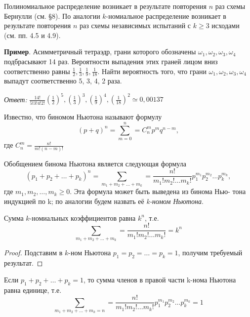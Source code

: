 
Полиномиальное распределение возникает в результате повторения $n$ раз
схемы Бернулли (см. §8). По аналогии $k$-номиальное распределение возникает в результате повторения $n$ раз схемы независимых испытаний с $k \geqslant 3$
исходами (см. пп. 4.5 и 4.9).

\textbf{Пример}. Асимметричный тетраэдр, грани которого обозначены $\omega_1, \omega_2,
\omega_3, \omega_4$ подбрасывают 14 раз. Вероятности выпадения этих граней лицом вниз
соответственно равны $\frac{1}{2},\frac{1}{3},\frac{1}{9},\frac{1}{18}$. Найти вероятность того, что грани $\omega_1, \omega_2, \omega_3, \omega_4$ выпадут соответственно 5, 3, 4, 2 раза.

\textit{Ответ: }$\frac{14!}{5!3!4!2!}(\frac{1}{2})^5,(\frac{1}{3})^3,(\frac{1}{9})^4,(\frac{1}{18})^2\simeq0,00137$

\begin{remark}
	Известно, что биномом Ньютона называют формулу
	\begin{equation*}
		(p+q)^n	=\sum\limits^n_{m=0}=C_n^mp^mq^{n-m},
	\end{equation*}
	где $C_n^m=\frac{n!}{m!(n-m)!}$


Обобщением бинома Ньютона является следующая формула
\begin{equation*}
	(p_1+p_2+\dots+ p_k)^n=\sum\limits_{m_1+m_2+\dots+m_k}=\frac{n!}{m_1!m_2!\dots m_k!}p_1^{m_1}p_2^{m_2}\dots p_k^{m_k},
\end{equation*}
где $m_1, m_2,\dots, m_k \geqslant 0$. Эта формула может быть выведена из бинома Нью-
тона индукцией по k; по аналогии будем назвать её \textit{k-номом Ньютона}.

\end{remark}

\begin{lemma}
	Сумма $k$-номиальных коэффициентов равна $k^n$, т.е.
	\begin{equation*}
		\sum\limits_{m_1+m_2+\dots+m_k}=\frac{n!}{m_1!m_2!\dots m_k!}=k^n
	\end{equation*}

\end{lemma}

\begin{proof}
Подставим в $k$-ном Ньютона $p_1 = p_2 = \dots = p_k = 1$,
получим требуемый результат.
\end{proof}

\begin{lemma}
	Если $p_1+p_2+\dots+p_k = 1$, то сумма членов в правой части
k-нома Ньютона равна единице, т.е.
\begin{equation*}
	\sum\limits_{m_1+m_2+\dots+m_k=n}=\frac{n!}{m_1!m_2!\dots m_k!}p_1^{m_1}p_2^{m_2}\dots p_k^{m_k}=1
\end{equation*}
\end{lemma}

